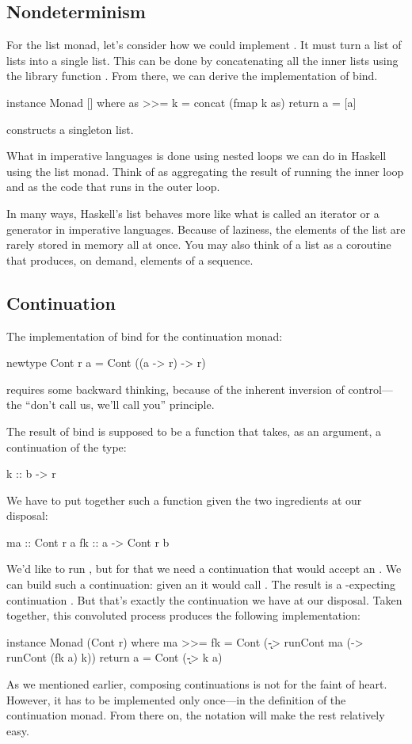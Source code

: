 \documentclass[DaoFP]{subfiles}
\begin{document}
\subsection{Nondeterminism}

For the list monad, let's consider how we could implement . It must turn a list of lists into a single list. This can be done by concatenating all the inner lists using the library function . From there, we can derive the implementation of bind.
\begin{haskell}
instance Monad [] where
  as >>= k = concat (fmap k as)
  return a = [a]
\end{haskell}
 constructs a singleton list.

What in imperative languages is done using nested loops we can do in Haskell using the list monad. Think of  as aggregating the result of running the inner loop and  as the code that runs in the outer loop. 

In many ways, Haskell's list behaves more like what is called an iterator or a generator in imperative languages. Because of laziness, the elements of the list are rarely stored in memory all at once. You may also think of a list as a coroutine that produces, on demand, elements of a sequence.

\subsection{Continuation}

The implementation of bind for the continuation monad:

\begin{haskell}
newtype Cont r a = Cont ((a -> r) -> r)
\end{haskell}
requires some backward thinking, because of the inherent inversion of control---the ``don't call us, we'll call you'' principle. 

The result of bind is supposed to be a function that takes, as an argument, a continuation  of the type:
\begin{haskell}
k :: b -> r
\end{haskell}
We have to put together such a function given the two ingredients at our disposal: 
\begin{haskell}
ma :: Cont r a
fk :: a -> Cont r b
\end{haskell}
We'd like to run , but for that we need a continuation that would accept an . We can build such a continuation: given an  it would call . The result is a -expecting continuation . But that's exactly the continuation  we have at our disposal. Taken together, this convoluted process produces the following implementation:
\begin{haskell}
instance Monad (Cont r) where
  ma >>= fk = Cont (\k -> runCont ma (\a -> runCont (fk a) k))
  return a = Cont (\k -> k a)
\end{haskell}
As we mentioned earlier, composing continuations is not for the faint of heart. However, it has to be implemented only once---in the definition of the continuation monad. From there on, the  notation will make the rest relatively easy.
\end{document}
